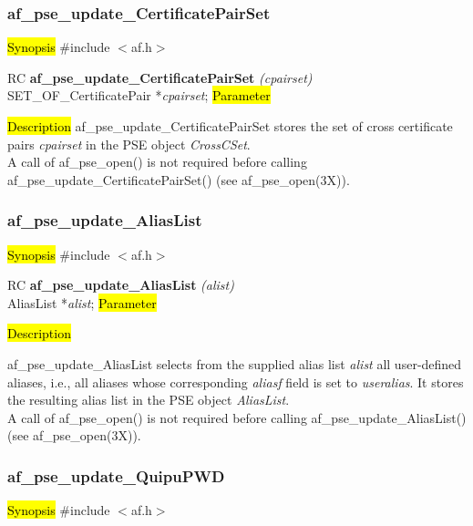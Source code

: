\subsubsection{af\_pse\_update\_CertificatePairSet}
\label{af_update_CertificatePairSet}
\hl{Synopsis}
\#include $<$af.h$>$

RC {\bf af\_pse\_update\_CertificatePairSet} {\em (cpairset)} \\
SET\_OF\_CertificatePair *{\em cpairset};
\hl{Parameter}

\hl{Description}
af\_pse\_update\_CertificatePairSet stores the set of cross certificate pairs {\em cpairset} 
in the PSE object {\em CrossCSet}.
\\ [1em]
A call of af\_pse\_open() is not required before calling af\_pse\_update\_CertificatePairSet()
(see af\_pse\_open(3X)).


\subsubsection{af\_pse\_update\_AliasList}
\label{af_update_AliasList}
\hl{Synopsis}
\#include $<$af.h$>$ 

RC {\bf af\_pse\_update\_AliasList} {\em (alist)} \\
AliasList *{\em alist};
\hl{Parameter}

\hl{Description}

af\_pse\_update\_AliasList selects from the supplied alias list {\em alist} all user-defined aliases, i.e.,
all aliases whose corresponding {\em aliasf} field is set to {\em useralias}. It stores the
resulting alias list in the PSE object {\em AliasList}.
\\ [1em]
A call of af\_pse\_open() is not required before calling af\_pse\_update\_AliasList()
(see af\_pse\_open(3X)).


\subsubsection{af\_pse\_update\_QuipuPWD}
\label{af_update_QuipuPWD}
\hl{Synopsis}
\#include $<$af.h$>$ 


